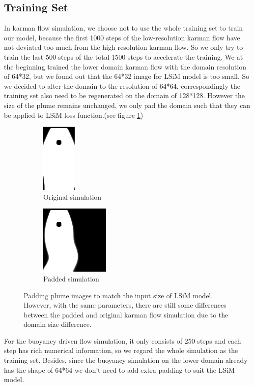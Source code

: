 \documentclass[a4paper,12pt,twoside]{report}
\begin{document}
\subsection{Training Set}
In karman flow simulation, we choose not to use the whole training set to train our model, because the first 1000 steps of the low-resolution karman flow have not deviated too much from the high resolution karman flow. So we only try to train the last 500 steps of the total 1500 steps to accelerate the training. We at the beginning trained the lower domain karman flow with the domain resolution of 64*32, but we found out that the 64*32 image for LSiM model is too small. So we decided to alter the domain to the resolution of 64*64, correspondingly the training set also need to be regenerated on the domain of 128*128. However the size of the plume remains unchanged, we only pad the domain such that they can be applied to LSiM loss function.(see figure \ref{pad})
\begin{figure}
\centering
\begin{subfigure}{0.4\textwidth}
  \centering
  \includegraphics[scale=1]{nonpad_karmanflow.png}
  \caption{Original simulation}
\end{subfigure}
\begin{subfigure}{0.4\textwidth}
  \centering
  \includegraphics[scale=1]{pad_karmanflow.png}
  \caption{Padded simulation}
\end{subfigure}
\caption{Padding plume images to match the input size of LSiM model. However, with the same parameters, there are still some differences between the padded and original karman flow simulation due to the domain size difference.}
\label{pad}
\end{figure}
For the buoyancy driven flow simulation, it only consists of 250 steps and each step has rich numerical information, so we regard the whole simulation as the training set. Besides, since the buoyancy simulation on the lower domain already has the shape of 64*64 we don't need to add extra padding to suit the LSiM model.
\end{document}

